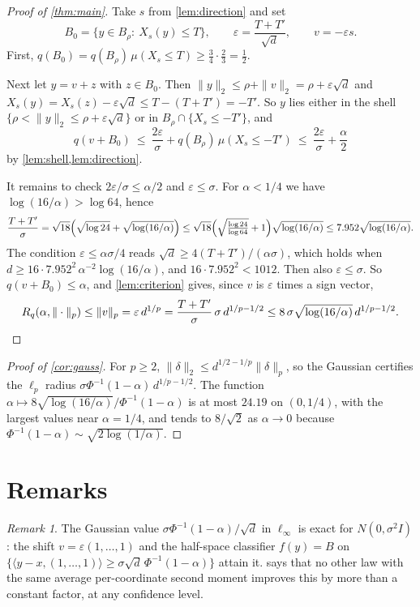 \documentclass[11pt]{amsart}
\theoremstyle{definition}
\theoremstyle{remark}
\newtheorem{remark}[theorem]{Remark}
\newcommand{\Rad}{R}
\begin{document}
\begin{proof}[Proof of \cref{thm:main}]
Take $s$ from \cref{lem:direction} and set
\[
B_0=\{y\in B_\rho:\ X_s(y)\le T\},\qquad \varepsilon=\frac{T+T'}{\sqrt d},\qquad v=-\varepsilon s .
\]
First, $q(B_0)=q(B_\rho)\,\mu(X_s\le T)\ge\frac34\cdot\frac23=\frac12$.

Next let $y=v+z$ with $z\in B_0$. Then $\|y\|_2\le\rho+\|v\|_2=\rho+\varepsilon\sqrt d$ and
$X_s(y)=X_s(z)-\varepsilon\sqrt d\le T-(T+T')=-T'$. So $y$ lies either in the shell
$\{\rho<\|y\|_2\le\rho+\varepsilon\sqrt d\}$ or in $B_\rho\cap\{X_s\le-T'\}$, and
\[
q(v+B_0)\ \le\ \frac{2\varepsilon}{\sigma}+q(B_\rho)\,\mu(X_s\le-T')\ \le\ \frac{2\varepsilon}{\sigma}+\frac{\alpha}{2}
\]
by \cref{lem:shell,lem:direction}.

It remains to check $2\varepsilon/\sigma\le\alpha/2$ and $\varepsilon\le\sigma$. For $\alpha<1/4$ we have
$\log(16/\alpha)>\log64$, hence
\[
\frac{T+T'}{\sigma}=\sqrt{18}\Bigl(\sqrt{\log24}+\sqrt{\log(16/\alpha)}\Bigr)
\le\sqrt{18}\Bigl(\sqrt{\tfrac{\log24}{\log64}}+1\Bigr)\sqrt{\log(16/\alpha)}\le 7.952\sqrt{\log(16/\alpha)} .
\]
The condition $\varepsilon\le\alpha\sigma/4$ reads $\sqrt d\ge4(T+T')/(\alpha\sigma)$, which holds when
$d\ge16\cdot7.952^2\,\alpha^{-2}\log(16/\alpha)$, and $16\cdot7.952^2<1012$. Then also $\varepsilon\le\sigma$.
So $q(v+B_0)\le\alpha$, and \cref{lem:criterion} gives, since $v$ is $\varepsilon$ times a sign vector,
\[
\Rad_q(\alpha,\|\cdot\|_p)\le\|v\|_p=\varepsilon\,d^{1/p}=\frac{T+T'}{\sigma}\,\sigma\,d^{1/p-1/2}
\le8\,\sigma\sqrt{\log(16/\alpha)}\,d^{1/p-1/2}.\qedhere
\]
\end{proof}

\begin{proof}[Proof of \cref{cor:gauss}]
For $p\ge2$, $\|\delta\|_2\le d^{1/2-1/p}\|\delta\|_p$, so the Gaussian certifies the $\ell_p$ radius
$\sigma\Phi^{-1}(1-\alpha)\,d^{1/p-1/2}$. The function $\alpha\mapsto8\sqrt{\log(16/\alpha)}/\Phi^{-1}(1-\alpha)$ is
at most $24.19$ on $(0,1/4)$, with the largest values near $\alpha=1/4$, and tends to $8/\sqrt2$ as $\alpha\to0$
because $\Phi^{-1}(1-\alpha)\sim\sqrt{2\log(1/\alpha)}$.
\end{proof}

\section{Remarks}

\begin{remark}
The Gaussian value $\sigma\Phi^{-1}(1-\alpha)/\sqrt d$ in $\ell_\infty$ is exact for $N(0,\sigma^2I)$: the shift
$v=\varepsilon(1,\dots,1)$ and the half-space classifier $f(y)=B$ on $\{\langle y-x,(1,\dots,1)\rangle\ge
\sigma\sqrt d\,\Phi^{-1}(1-\alpha)\}$ attain it.  says that no other law with the same average
per-coordinate second moment improves this by more than a constant factor, at any confidence level.
\end{remark}
\end{document}
